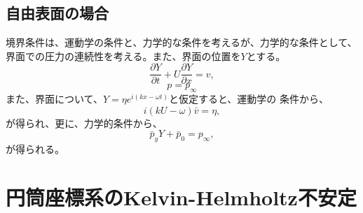 \subsection{自由表面の場合}
境界条件は、運動学の条件と、力学的な条件を考えるが、力学的な条件として、
界面での圧力の連続性を考える。また、界面の位置を$Y$とする。
\begin{equation}
 \frac{\partial Y}{\partial t}+U\frac{\partial Y}{\partial x}=v,
\end{equation}
\begin{equation}
 p=p_{\infty}
\end{equation}
また、界面について、$Y=\eta e^{i(kx - \omega t)}$と仮定すると、運動学の
条件から、
\begin{equation}
 i(kU-\omega)\bar{v}=\eta,
\end{equation}
が得られ、更に、力学的条件から、
\begin{equation}
 \bar{p}_yY+\bar{p}_0 = p_{\infty},
\end{equation}
が得られる。
\section{円筒座標系のKelvin-Helmholtz不安定}

